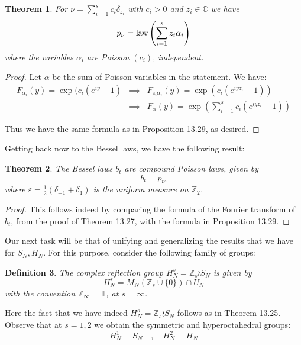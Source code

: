 \documentclass[12pt]{amsbook}
\newtheorem{theorem}{Theorem}[chapter]
\newtheorem{definition}[theorem]{Definition}
\begin{document}
\begin{theorem}
For $\nu=\sum_{i=1}^sc_i\delta_{z_i}$ with $c_i>0$ and $z_i\in\mathbb C$ we have
$$p_\nu={\rm law}\left(\sum_{i=1}^sz_i\alpha_i\right)$$
where the variables $\alpha_i$ are Poisson $(c_i)$, independent.
\end{theorem}

\begin{proof}
Let $\alpha$ be the sum of Poisson variables in the statement. We have:
\begin{eqnarray*}
F_{\alpha_i}(y)=\exp(c_i(e^{iy}-1)
&\implies&F_{z_i\alpha_i}(y)=\exp(c_i(e^{iyz_i}-1))\\
&\implies&F_\alpha(y)=\exp\left(\sum_{i=1}^sc_i(e^{iyz_i}-1)\right)
\end{eqnarray*}

Thus we have the same formula as in Proposition 13.29, as desired.
\end{proof}

Getting back now to the Bessel laws, we have the following result:


\begin{theorem}
The Bessel laws $b_t$ are compound Poisson laws, given by
$$b_t=p_{t\varepsilon}$$
where $\varepsilon=\frac{1}{2}(\delta_{-1}+\delta_1)$ is the uniform measure on $\mathbb Z_2$.
\end{theorem}

\begin{proof}
This follows indeed by comparing the formula of the Fourier transform of $b_t$, from the proof of Theorem 13.27, with the formula in Proposition 13.29.
\end{proof}

Our next task will be that of unifying and generalizing the results that we have for $S_N,H_N$. For this purpose, consider the following family of groups:


\begin{definition}
The complex reflection group $H_N^s=\mathbb Z_s\wr S_N$ is given by
$$H_N^s=M_N(\mathbb Z_s\cup\{0\})\cap U_N$$
with the convention $\mathbb Z_\infty=\mathbb T$, at $s=\infty$.
\end{definition}

Here the fact that we have indeed $H_N^s=\mathbb Z_s\wr S_N$ follows as in Theorem 13.25. Observe that at $s=1,2$ we obtain the symmetric and hyperoctahedral groups:
$$H_N^1=S_N\quad,\quad 
H_N^2=H_N$$
\end{document}
